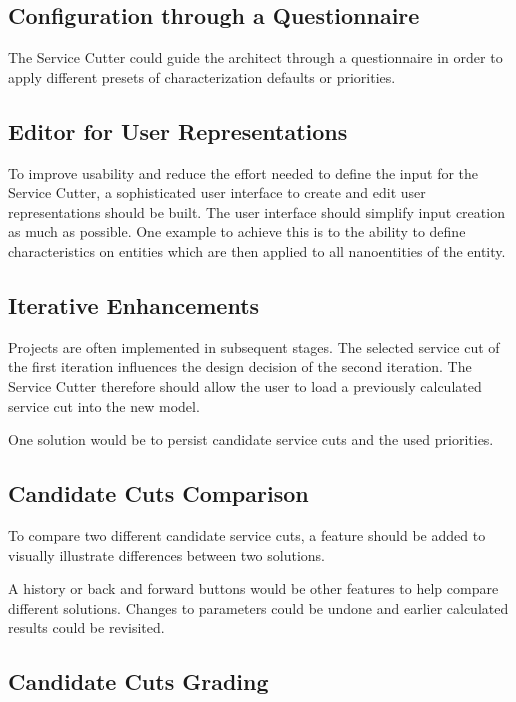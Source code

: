 \subsection{Configuration through a Questionnaire}

The Service Cutter could guide the architect through a questionnaire in order to apply different presets of characterization defaults or priorities.

\subsection{Editor for User Representations}

To improve usability and reduce the effort needed to define the input for the Service Cutter, a sophisticated user interface to create and edit user representations should be built. The user interface should simplify input creation as much as possible. One example to achieve this is to the ability to define characteristics on entities which are then applied to all nanoentities of the entity. 

\subsection{Iterative Enhancements}

Projects are often implemented in subsequent stages. The selected service cut of the first iteration influences the design decision of the second iteration. The Service Cutter therefore should allow the user to load a previously calculated service cut into the new model.

One solution would be to persist candidate service cuts and the used priorities. 

\subsection{Candidate Cuts Comparison}

To compare two different candidate service cuts, a feature should be added to visually illustrate differences between two solutions. 

A history or back and forward buttons would be other features to help compare different solutions. Changes to parameters could be undone and earlier calculated results could be revisited.

\subsection{Candidate Cuts Grading}
\label{sec:suggested-cut-grades}

